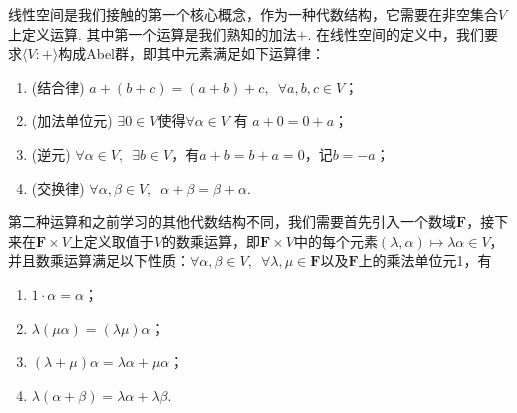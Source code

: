 线性空间是我们接触的第一个核心概念，作为一种代数结构，它需要在非空集合$V$上定义运算. 其中第一个运算是我们熟知的加法$+$. 在线性空间的定义中，我们要求$\langle V:+\rangle$构成Abel群，即其中元素满足如下运算律：
\begin{enumerate}
    \item (结合律) $a+(b+c)=(a+b)+c,\enspace\forall a,b,c\in V$；

    \item (加法单位元) $\exists 0 \in V$使得$\forall\alpha\in V$ 有 $a+0=0+a$；

    \item (逆元) $\forall\alpha\in V,\enspace \exists b\in V$，有$a+b=b+a=0$，记$b=-a$；

    \item (交换律) $\forall\alpha, \beta\in V,\enspace \alpha+\beta=\beta+\alpha$.
\end{enumerate}

第二种运算和之前学习的其他代数结构不同，我们需要首先引入一个数域$\mathbf{F}$，接下来在$\mathbf{F}\times V$上定义取值于$V$的数乘运算，即$\mathbf{F}\times V$中的每个元素$(\lambda,\alpha)\mapsto \lambda\alpha\in V$，并且数乘运算满足以下性质：$\forall \alpha,\beta \in V,\enspace\forall \lambda,\mu\in\mathbf{F}$以及$\mathbf{F}$上的乘法单位元1，有
\begin{enumerate}
    \item $1\cdot \alpha=\alpha$；

    \item $\lambda(\mu\alpha)=(\lambda\mu)\alpha$；

    \item $(\lambda+\mu)\alpha=\lambda\alpha+\mu\alpha$；

    \item $\lambda(\alpha+\beta)=\lambda\alpha+\lambda\beta$.
\end{enumerate}

